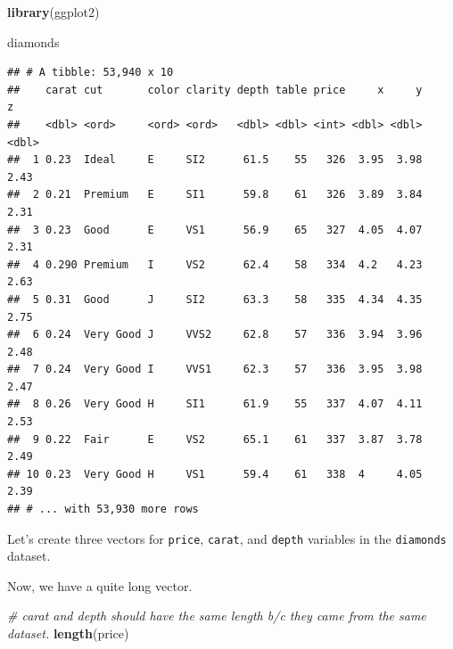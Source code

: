 \documentclass[]{book}
\newenvironment{Shaded}{\begin{snugshade}}{\end{snugshade}}
\newcommand{\CommentTok}[1]{\textcolor[rgb]{0.56,0.35,0.01}{\textit{#1}}}
\newcommand{\KeywordTok}[1]{\textcolor[rgb]{0.13,0.29,0.53}{\textbf{#1}}}
\newcommand{\NormalTok}[1]{#1}
\newcommand{\OperatorTok}[1]{\textcolor[rgb]{0.81,0.36,0.00}{\textbf{#1}}}
\newcommand{\StringTok}[1]{\textcolor[rgb]{0.31,0.60,0.02}{#1}}
\begin{document}
\begin{Shaded}
\begin{Highlighting}[]
\KeywordTok{library}\NormalTok{(ggplot2)}
\end{Highlighting}
\end{Shaded}

\begin{Shaded}
\begin{Highlighting}[]
\NormalTok{diamonds}
\end{Highlighting}
\end{Shaded}

\begin{verbatim}
## # A tibble: 53,940 x 10
##    carat cut       color clarity depth table price     x     y     z
##    <dbl> <ord>     <ord> <ord>   <dbl> <dbl> <int> <dbl> <dbl> <dbl>
##  1 0.23  Ideal     E     SI2      61.5    55   326  3.95  3.98  2.43
##  2 0.21  Premium   E     SI1      59.8    61   326  3.89  3.84  2.31
##  3 0.23  Good      E     VS1      56.9    65   327  4.05  4.07  2.31
##  4 0.290 Premium   I     VS2      62.4    58   334  4.2   4.23  2.63
##  5 0.31  Good      J     SI2      63.3    58   335  4.34  4.35  2.75
##  6 0.24  Very Good J     VVS2     62.8    57   336  3.94  3.96  2.48
##  7 0.24  Very Good I     VVS1     62.3    57   336  3.95  3.98  2.47
##  8 0.26  Very Good H     SI1      61.9    55   337  4.07  4.11  2.53
##  9 0.22  Fair      E     VS2      65.1    61   337  3.87  3.78  2.49
## 10 0.23  Very Good H     VS1      59.4    61   338  4     4.05  2.39
## # ... with 53,930 more rows
\end{verbatim}

Let's create three vectors for \texttt{price}, \texttt{carat}, and \texttt{depth} variables in the \texttt{diamonds} dataset.

\begin{Shaded}
\end{Shaded}

Now, we have a quite long vector.

\begin{Shaded}
\begin{Highlighting}[]
\CommentTok{# carat and depth should have the same length b/c they came from the same dataset. }
\KeywordTok{length}\NormalTok{(price)}
\end{Highlighting}
\end{Shaded}
\end{document}
